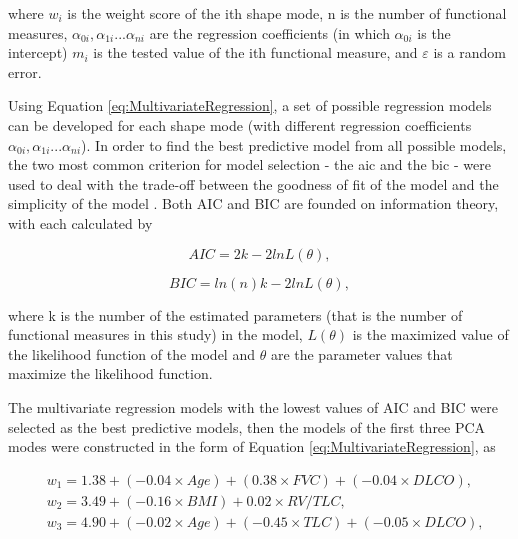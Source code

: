 \noindent where $w_i$ is the weight score of the ith shape mode, n is the number of functional measures, $\alpha_{0i}, \alpha_{1i} ... \alpha_{ni}$ are the regression coefficients (in which $\alpha_{0i}$ is the intercept) $m_i$ is the tested value of the ith functional measure, and $\varepsilon$ is a random error. 

Using Equation \ref{eq:MultivariateRegression}, a set of possible regression models can be developed for each shape mode (with different regression coefficients $\alpha_{0i}, \alpha_{1i} ... \alpha_{ni}$). In order to find the best predictive model from all possible models, the two most common criterion for model selection - the \gls{aic} and the \gls{bic} - were used to deal with the trade-off between the goodness of fit of the model and the simplicity of the model \citep{aho2014model}. Both AIC and BIC are founded on information theory, with each calculated by

\begin{equation}
 \label{eq:AIC}
 AIC = 2k - 2lnL(\theta),
\end{equation}

\begin{equation}
 \label{eq:BIC}
 BIC = ln(n)k - 2lnL(\theta),
\end{equation}

\noindent where k is the number of the estimated parameters (that is the number of functional measures in this study) in the model, $L(\theta)$ is the maximized value of the likelihood function of the model and $\theta$ are the parameter values that maximize the likelihood function.

The multivariate regression models with the lowest values of AIC and BIC were selected as the best predictive models, then the models of the first three PCA modes were constructed in the form of Equation \ref{eq:MultivariateRegression}, as

\begin{equation} 
 \label{eq:TerminalBoundaryCondition}
 \begin{split}
 & w_1 = 1.38 + (-0.04 \times Age) + (0.38 \times FVC) + (-0.04 \times DLCO), \\
 & w_2 = 3.49 + (-0.16 \times BMI) + 0.02 \times RV/TLC, \\
 & w_3 = 4.90 + (-0.02 \times Age) + (-0.45 \times TLC) + (-0.05 \times DLCO), \\
 \end{split}
\end{equation}
 
